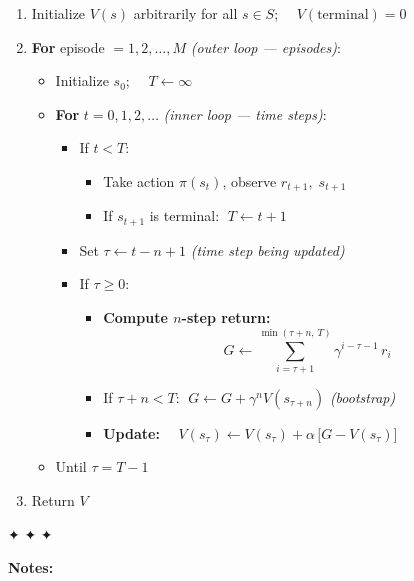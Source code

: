 \documentclass[11pt]{article}
\providecommand{\tightlist}{%
      \setlength{\itemsep}{0pt}\setlength{\parskip}{0pt}}
\begin{document}
\begin{enumerate}
\def\labelenumi{\arabic{enumi}.}
\item
  Initialize \(V(s)\) arbitrarily for all \(s \in S\);
  \(\quad V(\text{terminal}) = 0\)
\item
  \textbf{For} episode \(= 1, 2, \ldots, M\) \emph{(outer loop ---
  episodes)}:

  \begin{itemize}
  \tightlist
  \item
    Initialize \(s_0\); \(\quad T \leftarrow \infty\)
  \item
    \textbf{For} \(t = 0, 1, 2, \ldots\) \emph{(inner loop --- time
    steps)}:

    \begin{itemize}
    \tightlist
    \item
      If \(t < T\):

      \begin{itemize}
      \tightlist
      \item
        Take action \(\pi(s_t)\), observe \(r_{t+1},\; s_{t+1}\)
      \item
        If \(s_{t+1}\) is terminal: \(\;T \leftarrow t+1\)
      \end{itemize}
    \item
      Set \(\tau \leftarrow t - n + 1\) \emph{(time step being updated)}
    \item
      If \(\tau \geq 0\):

      \begin{itemize}
      \tightlist
      \item
        \textbf{Compute \(n\)-step return:}
        \[G \leftarrow \sum_{i=\tau+1}^{\min(\tau+n,\,T)} \gamma^{i-\tau-1}\, r_i\]
      \item
        If \(\tau + n < T\):
        \(\;G \leftarrow G + \gamma^n V(s_{\tau+n})\) \emph{(bootstrap)}
      \item
        \textbf{Update:}
        \(\quad V(s_\tau) \leftarrow V(s_\tau) + \alpha\,\bigl[G - V(s_\tau)\bigr]\)
      \end{itemize}
    \end{itemize}
  \item
    Until \(\tau = T - 1\)
  \end{itemize}
\item
  Return \(V\)
\end{enumerate}

✦ ✦ ✦

\textbf{Notes:}
\end{document}

